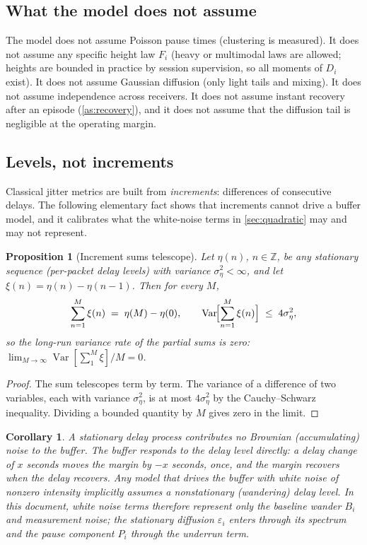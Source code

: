 \documentclass[11pt, a4paper]{article}
\theoremstyle{definition}
\theoremstyle{plain}
\newtheorem{proposition}[theorem]{Proposition}
\newtheorem{corollary}[theorem]{Corollary}
\theoremstyle{remark}
\newcommand{\Var}{\operatorname{Var}}
\begin{document}
\subsection{What the model does not assume}\label{sec:not-assumed}

The model does not assume Poisson pause times (clustering is measured).
It does not assume any specific height law $F_i$ (heavy or multimodal laws
are allowed; heights are bounded in practice by session supervision, so
all moments of $D_i$ exist).  It does not assume Gaussian diffusion (only
light tails and mixing).  It does not assume independence across
receivers.  It does not assume instant recovery after an episode
(\cref{as:recovery}), and it does not assume that the diffusion tail is
negligible at the operating margin.

\subsection{Levels, not increments}\label{sec:levels-not-increments}

Classical jitter metrics are built from \emph{increments}: differences of
consecutive delays.  The following elementary fact shows that increments
cannot drive a buffer model, and it calibrates what the white-noise terms
in \cref{sec:quadratic} may and may not represent.

\begin{proposition}[Increment sums telescope]\label{prop:telescope}
Let $\eta(n)$, $n \in \mathbb{Z}$, be any stationary sequence (per-packet
delay levels) with variance $\sigma_\eta^2 < \infty$, and let
$\xi(n) = \eta(n)-\eta(n-1)$.  Then for every $M$,
\[
  \sum_{n=1}^{M} \xi(n) \;=\; \eta(M) - \eta(0),
  \qquad
  \Var\!\Bigl[\sum_{n=1}^{M}\xi(n)\Bigr] \;\le\; 4\sigma_\eta^2 ,
\]
so the long-run variance rate of the partial sums is zero:
$\lim_{M\to\infty} \Var[\sum_1^M \xi]/M = 0$.
\end{proposition}

\begin{proof}
The sum telescopes term by term.  The variance of a difference of two
variables, each with variance $\sigma_\eta^2$, is at most
$4\sigma_\eta^2$ by the Cauchy--Schwarz inequality.  Dividing a bounded
quantity by $M$ gives zero in the limit.
\end{proof}

\begin{corollary}\label{cor:no-brownian}
A stationary delay process contributes no Brownian (accumulating) noise to
the buffer.  The buffer responds to the delay \emph{level} directly:
a delay change of $x$ seconds moves the margin by $-x$ seconds, once, and
the margin recovers when the delay recovers.  Any model that drives the
buffer with white noise of nonzero intensity implicitly assumes a
\emph{nonstationary} (wandering) delay level.  In this document, white
noise terms therefore represent only the baseline wander $B_i$ and
measurement noise; the stationary diffusion $\varepsilon_i$ enters through
its spectrum and the pause component $P_i$ through the underrun term.
\end{corollary}
\end{document}
